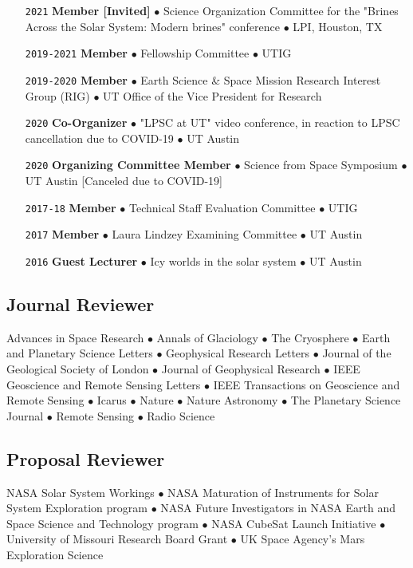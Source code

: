 \begin{itemize}[leftmargin=5.8em, labelsep=1.5em]
    \item[\texttt{2021}] \textbf{Member [Invited]} $\bullet$ Science Organization Committee for the "Brines Across the Solar System: Modern brines" conference $\bullet$ LPI, Houston, TX
    \item[\texttt{2019-2021}] \textbf{Member} $\bullet$ Fellowship Committee $\bullet$ UTIG
    \item[\texttt{2019-2020}] \textbf{Member} $\bullet$ Earth Science \& Space Mission Research Interest Group (RIG) $\bullet$ UT Office of the Vice President for Research
    \item[\texttt{2020}] \textbf{Co-Organizer} $\bullet$ "LPSC at UT" video conference, in reaction to LPSC cancellation due to COVID-19 $\bullet$ UT Austin
    \item[\texttt{2020}] \textbf{Organizing Committee Member} $\bullet$ Science from Space Symposium $\bullet$ UT Austin [Canceled due to COVID-19]
    \item[\texttt{2017-18}] \textbf{Member} $\bullet$ Technical Staff Evaluation Committee $\bullet$ UTIG
    \item[\texttt{2017}] \textbf{Member} $\bullet$ Laura Lindzey Examining Committee $\bullet$ UT Austin
    \item[\texttt{2016}] \textbf{Guest Lecturer} $\bullet$ Icy worlds in the solar system $\bullet$ UT Austin
\end{itemize}

\vspace{-2em}
\subsection*{Journal Reviewer}

Advances in Space Research $\bullet$ Annals of Glaciology $\bullet$ The Cryosphere $\bullet$ Earth and Planetary Science Letters $\bullet$ Geophysical Research Letters $\bullet$ Journal of the Geological Society of London $\bullet$ Journal of Geophysical Research $\bullet$ IEEE Geoscience and Remote Sensing Letters $\bullet$ IEEE Transactions on Geoscience and Remote Sensing $\bullet$ Icarus $\bullet$ Nature $\bullet$ Nature Astronomy $\bullet$ The Planetary Science Journal $\bullet$ Remote Sensing $\bullet$ Radio Science

\vspace{-1em}
\subsection*{Proposal Reviewer}
 NASA Solar System Workings $\bullet$ NASA Maturation of Instruments for Solar System Exploration program $\bullet$ NASA Future Investigators in NASA Earth and Space Science and Technology program $\bullet$ NASA CubeSat Launch Initiative $\bullet$ University of Missouri Research Board Grant $\bullet$ UK Space Agency’s Mars Exploration Science

